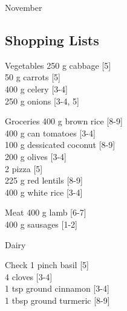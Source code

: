 \begin{menu}{November}
    \subsection*{Shopping Lists}
      \begin{shoppinglist}{Vegetables}
      250 g cabbage 
        {\scriptsize[5]}\\
      50 g carrots 
        {\scriptsize[5]}\\
      400 g celery 
        {\scriptsize[3-4]}\\
      250 g onions 
        {\scriptsize[3-4, 5]}\\
      \end{shoppinglist}%
      \begin{shoppinglist}{Groceries}
      400 g brown rice 
        {\scriptsize[8-9]}\\
      400 g can tomatoes 
        {\scriptsize[3-4]}\\
      100 g dessicated coconut 
        {\scriptsize[8-9]}\\
      200 g olives 
        {\scriptsize[3-4]}\\
      2  pizza 
        {\scriptsize[5]}\\
      225 g red lentils 
        {\scriptsize[8-9]}\\
      400 g white rice 
        {\scriptsize[3-4]}\\
      \end{shoppinglist}%
      \par\vfil %
      \begin{shoppinglist}{Meat}
      400 g lamb 
        {\scriptsize[6-7]}\\
      400 g sausages 
        {\scriptsize[1-2]}\\
      \end{shoppinglist}%
      \begin{shoppinglist}{Dairy}
      \end{shoppinglist}%
      \par\vfil %
      \vfil\clearpage %
      \begin{shoppinglist}{Check}
      1 pinch basil 
        {\scriptsize[5]}\\
      4  cloves 
        {\scriptsize[3-4]}\\
      1 tsp ground cinnamon 
        {\scriptsize[3-4]}\\
      1 tbsp ground turmeric 
        {\scriptsize[8-9]}\\

\end{shoppinglist}
\end{menu}
